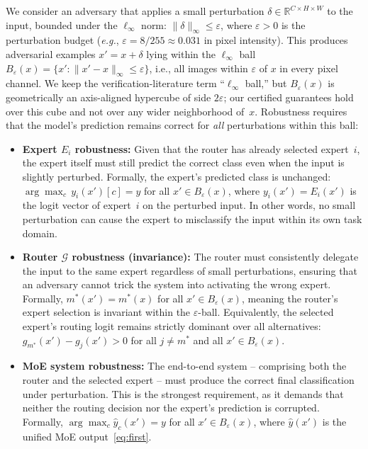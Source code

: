 \documentclass[runningheads]{llncs}
\begin{document}
We consider an adversary that applies a small perturbation $\delta \in \mathbb{R}^{C \times H \times W}$ to the input, bounded under the $\ell_\infty$ norm: $\|\delta\|_\infty \leq \varepsilon$, where $\varepsilon > 0$ is the perturbation budget (\emph{e.g.}, $\varepsilon = 8/255 \approx 0.031$ in pixel intensity). This produces adversarial examples $x' = x + \delta$ lying within the $\ell_\infty$ ball $B_\varepsilon(x) = \{x' : \|x' - x\|_\infty \leq \varepsilon\}$, i.e., all images within $\varepsilon$ of $x$ in every pixel channel. We keep the verification-literature term ``$\ell_\infty$ ball,'' but $B_\varepsilon(x)$ is geometrically an axis-aligned hypercube of side $2\varepsilon$; our certified guarantees hold over this cube and not over any wider neighborhood of~$x$. Robustness requires that the model's prediction remains correct for \emph{all} perturbations within this ball:

\begin{itemize}
    \item \textbf{Expert $E_i$ robustness:} Given that the router has already selected expert~$i$, the expert itself must still predict the correct class even when the input is slightly perturbed. Formally, the expert's predicted class is unchanged: $\arg\max_c\, y_i(x')[c] = y$ for all $x' \in B_\varepsilon(x)$, where $y_i(x') = E_i(x')$ is the logit vector of expert~$i$ on the perturbed input. In other words, no small perturbation can cause the expert to misclassify the input within its own task domain.
    \item \textbf{Router $\mathcal{G}$ robustness (invariance):} The router must consistently delegate the input to the same expert regardless of small perturbations, ensuring that an adversary cannot trick the system into activating the wrong expert. Formally, $m^*(x') = m^*(x)$ for all $x' \in B_\varepsilon(x)$, meaning the router's expert selection is invariant within the $\varepsilon$-ball. Equivalently, the selected expert's routing logit remains strictly dominant over all alternatives: $g_{m^*}(x') - g_j(x') > 0$ for all $j \neq m^*$ and all $x' \in B_\varepsilon(x)$.
    \item \textbf{MoE system robustness:} The end-to-end system -- comprising both the router and the selected expert -- must produce the correct final classification under perturbation. This is the strongest requirement, as it demands that neither the routing decision nor the expert's prediction is corrupted. Formally, $\arg\max_c \hat{y}_c(x') = y$ for all $x' \in B_\varepsilon(x)$, where $\hat{y}(x')$ is the unified MoE output~\eqref{eq:first}.
\end{itemize}
\end{document}
